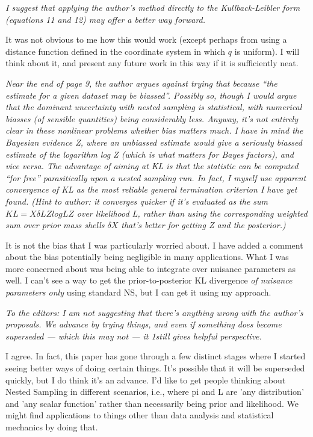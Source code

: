 \documentclass[a4paper, 12pt]{article}
\renewcommand{\quote}{\em \color{orange}}
\begin{document}
{\quote
I suggest that applying the author’s method directly to the Kullback-Leibler form (equations 11 and
12) may offer a better way forward.}

It was not obvious to me how this would work (except perhaps from using a
distance function defined in the coordinate system in which $q$ is uniform).
I will think about it, and present any future work in this way if it is
sufficiently neat.

{\quote 
Near the end of page 9, the author argues against trying that
because “the estimate for a given dataset may be biassed”. Possibly so, though I would argue that the
dominant uncertainty with nested sampling is statistical, with numerical biasses (of sensible quantities)
being considerably less. Anyway, it’s not entirely clear in these nonlinear problems whether bias matters
much. I have in mind the Bayesian evidence Z, where an unbiassed estimate would give a seriously
biassed estimate of the logarithm log Z (which is what matters for Bayes factors), and vice versa.
The advantage of aiming at KL is that the statistic can be computed “for free” parasitically upon
a nested sampling run. In fact, I myself use apparent convergence of KL as the most reliable general
termination criterion I have yet found. (Hint to author: it converges quicker if it’s evaluated as the sum
$KL =
X \delta L
Z
log
L
Z$
over likelihood L, rather than using the corresponding weighted sum over prior mass shells $\delta X$ that’s
better for getting Z and the posterior.)}

It is not the bias that I was particularly worried about. I have added a
comment about the bias potentially being negligible in many applications.
What I was more concerned about was being able to integrate over nuisance
parameters as well. I can't see a way to get the prior-to-posterior
KL divergence {\em of nuisance parameters only} using standard NS, but I can
get it using my approach.


{\quote
To the editors: I am not suggesting that there’s anything wrong with the author’s proposals. We
advance by trying things, and even if something does become superseded — which this may not — it
1still gives helpful perspective.}

I agree. In fact, this paper has gone through a few distinct stages where I
started seeing better ways of doing certain things. It's possible that it
will be superseded quickly, but I do think it's an advance. I'd like to get
people thinking about Nested Sampling in different scenarios, i.e., where
pi and L are 'any distribution' and 'any scalar function' rather than necessarily
being prior and likelihood. We might find applications to things other than
data analysis and statistical mechanics by doing that.
\end{document}

